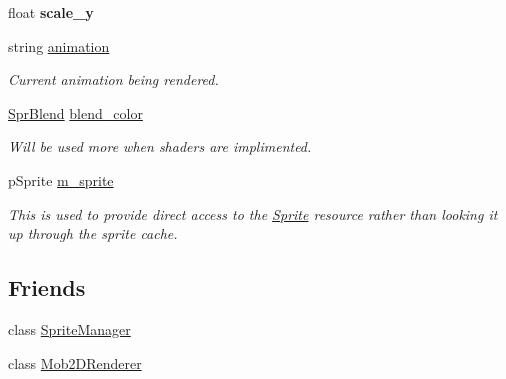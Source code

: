 \begin{DoxyCompactItemize}
\item 
\hypertarget{classmob2d__node_a5f268914af99645966641193430ae2fd}{
float {\bfseries scale\_\-y}}
\label{classmob2d__node_a5f268914af99645966641193430ae2fd}

\item 
\hypertarget{classmob2d__node_af304112dcdc7afa39bca7ecd89731f39}{
string \hyperlink{classmob2d__node_af304112dcdc7afa39bca7ecd89731f39}{animation}}
\label{classmob2d__node_af304112dcdc7afa39bca7ecd89731f39}

\begin{DoxyCompactList}\small\item\em Current animation being rendered. \item\end{DoxyCompactList}\item 
\hypertarget{classmob2d__node_a281b40edac302a8542496bcac3d7fcd3}{
\hyperlink{structmob2d__node_1_1SprBlend}{SprBlend} \hyperlink{classmob2d__node_a281b40edac302a8542496bcac3d7fcd3}{blend\_\-color}}
\label{classmob2d__node_a281b40edac302a8542496bcac3d7fcd3}

\begin{DoxyCompactList}\small\item\em Will be used more when shaders are implimented. \item\end{DoxyCompactList}\item 
\hypertarget{classmob2d__node_a833d0db4f67126db65a3fa966d85dd46}{
pSprite \hyperlink{classmob2d__node_a833d0db4f67126db65a3fa966d85dd46}{m\_\-sprite}}
\label{classmob2d__node_a833d0db4f67126db65a3fa966d85dd46}

\begin{DoxyCompactList}\small\item\em This is used to provide direct access to the \hyperlink{classSprite}{Sprite} resource rather than looking it up through the sprite cache. \item\end{DoxyCompactList}\end{DoxyCompactItemize}
\subsection*{Friends}
\begin{DoxyCompactItemize}
\item 
\hypertarget{classmob2d__node_ac495e8b586409665102aa3021200d453}{
class \hyperlink{classmob2d__node_ac495e8b586409665102aa3021200d453}{SpriteManager}}
\label{classmob2d__node_ac495e8b586409665102aa3021200d453}

\item 
\hypertarget{classmob2d__node_a0d669340e63fcad02cde401bbd5bcc23}{
class \hyperlink{classmob2d__node_a0d669340e63fcad02cde401bbd5bcc23}{Mob2DRenderer}}
\label{classmob2d__node_a0d669340e63fcad02cde401bbd5bcc23}

\end{DoxyCompactItemize}


